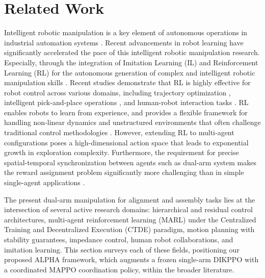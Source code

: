 \documentclass[lettersize,journal]{IEEEtran}
\begin{document}
\section{Related Work}
\label{related_work}
Intelligent robotic manipulation is a key element of autonomous operations in industrial automation systems \cite{surya2025iapf}. Recent advancements in robot learning have significantly accelerated the pace of this intelligent robotic manipulation research. Especially, through the integration of Imitation Learning (IL) and Reinforcement Learning (RL) for the autonomous generation of complex and intelligent robotic manipulation skills \cite{related-28, related-29}. Recent studies demonstrate that RL is highly effective for robot control across various domains, including trajectory optimization \cite{related-30, related-31}, intelligent pick-and-place operations \cite{related-32}, and human-robot interaction tasks \cite{related-33, related-34}. RL enables robots to learn from experience, and provides a flexible framework for handling non-linear dynamics and unstructured environments that often challenge traditional control methodologies \cite{related-35}. However, extending RL to multi-agent configurations poses a high-dimensional action space that leads to exponential growth in exploration complexity. Furthermore, the requirement for precise spatial-temporal synchronization between agents such as dual-arm system makes the reward assignment problem significantly more challenging than in simple single-agent applications \cite{related-36}.     

The present dual-arm manipulation for alignment and assembly tasks lies at the intersection of several active research domains: hierarchical and residual control architectures, multi-agent reinforcement learning (MARL) under the Centralized Training and Decentralized Execution (CTDE) paradigm, motion planning with stability guarantees, impedance control, human robot collaborations, and imitation learning. This section surveys each of these fields, positioning our proposed ALPHA framework, which augments a frozen single-arm DIKPPO with a coordinated MAPPO coordination policy, within the broader literature.
\end{document}
